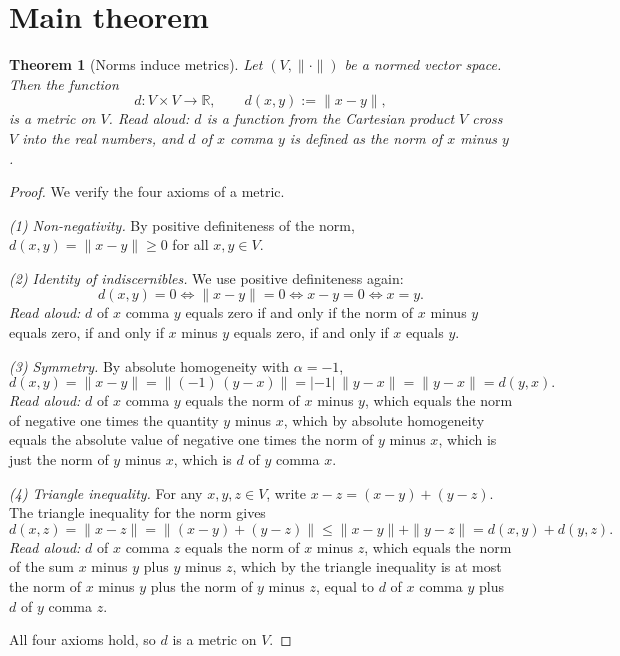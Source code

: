 \documentclass[11pt]{article}
\theoremstyle{definition}
\theoremstyle{plain}
\newtheorem{theorem}{Theorem}
\begin{document}
\section{Main theorem}

\begin{theorem}[Norms induce metrics]
\label{thm:norm-induces-metric}
Let $(V, \|\cdot\|)$ be a normed vector space. Then the function
\[
  d \colon V \times V \to \mathbb{R}, \qquad d(x,y) := \|x - y\|,
\]
is a metric on $V$.
\emph{Read aloud:} $d$ is a function from the Cartesian product $V$
cross $V$ into the real numbers, and $d$ of $x$ comma $y$ is defined as
the norm of $x$ minus $y$.
\end{theorem}

\begin{proof}
We verify the four axioms of a metric.

\smallskip
\noindent\emph{(1) Non-negativity.}
By positive definiteness of the norm,
$d(x,y) = \|x - y\| \ge 0$ for all $x,y \in V$.

\smallskip
\noindent\emph{(2) Identity of indiscernibles.}
We use positive definiteness again:
\[
  d(x,y) = 0
  \iff \|x - y\| = 0
  \iff x - y = 0
  \iff x = y.
\]
\emph{Read aloud:} $d$ of $x$ comma $y$ equals zero if and only if the
norm of $x$ minus $y$ equals zero, if and only if $x$ minus $y$ equals
zero, if and only if $x$ equals $y$.

\smallskip
\noindent\emph{(3) Symmetry.}
By absolute homogeneity with $\alpha = -1$,
\[
  d(x,y)
  = \|x - y\|
  = \bigl\|(-1)\,(y - x)\bigr\|
  = |-1|\,\|y - x\|
  = \|y - x\|
  = d(y,x).
\]
\emph{Read aloud:} $d$ of $x$ comma $y$ equals the norm of $x$ minus
$y$, which equals the norm of negative one times the quantity $y$ minus
$x$, which by absolute homogeneity equals the absolute value of negative
one times the norm of $y$ minus $x$, which is just the norm of $y$ minus
$x$, which is $d$ of $y$ comma $x$.

\smallskip
\noindent\emph{(4) Triangle inequality.}
For any $x,y,z \in V$, write $x - z = (x - y) + (y - z)$. The triangle
inequality for the norm gives
\[
  d(x,z)
  = \|x - z\|
  = \bigl\|(x - y) + (y - z)\bigr\|
  \le \|x - y\| + \|y - z\|
  = d(x,y) + d(y,z).
\]
\emph{Read aloud:} $d$ of $x$ comma $z$ equals the norm of $x$ minus
$z$, which equals the norm of the sum $x$ minus $y$ plus $y$ minus $z$,
which by the triangle inequality is at most the norm of $x$ minus $y$
plus the norm of $y$ minus $z$, equal to $d$ of $x$ comma $y$ plus $d$
of $y$ comma $z$.

All four axioms hold, so $d$ is a metric on $V$.
\end{proof}
\end{document}
